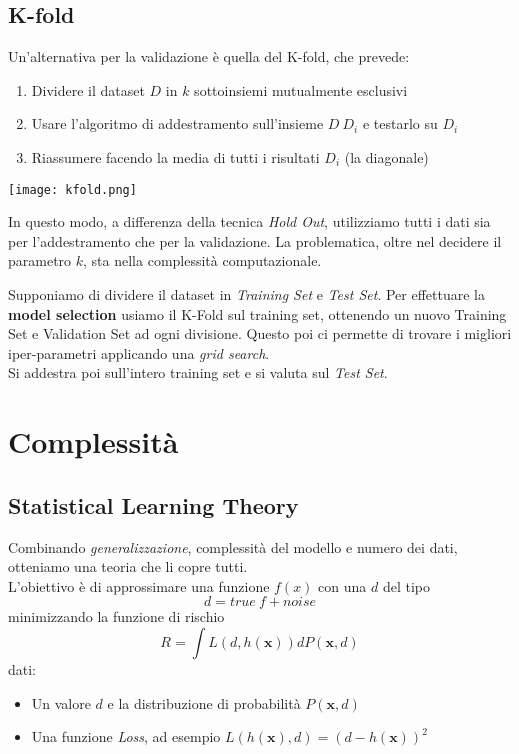 \subsection{K-fold}
Un'alternativa per la validazione è quella del K-fold, che prevede:
\begin{enumerate}
	\item Dividere il dataset $D$ in $k$ sottoinsiemi mutualmente esclusivi
	\item Usare l'algoritmo di addestramento sull'insieme $D\ D_i$ e testarlo su $D_i$
	\item Riassumere facendo la media di tutti i risultati $D_i$ (la diagonale)
\end{enumerate}
\begin{center}
	\texttt{[image: kfold.png]}
\end{center}
In questo modo, a differenza della tecnica \textit{Hold Out}, utilizziamo tutti i dati sia per l'addestramento che per la validazione. La problematica, oltre nel decidere il parametro $k$, sta nella complessità computazionale.

\begin{example}
	Supponiamo di dividere il dataset in \textit{Training Set} e \textit{Test Set}.
	Per effettuare la \textbf{model selection} usiamo il K-Fold sul training set, ottenendo un nuovo Training Set e Validation Set ad ogni divisione. Questo poi ci permette di trovare i migliori iper-parametri applicando una \textit{grid search}.\\
	Si addestra poi sull'intero training set e si valuta sul \textit{Test Set}.
\end{example}

\section{Complessità}
\subsection{Statistical Learning Theory}
Combinando \textit{generalizzazione}, complessità del modello e numero dei dati, otteniamo una teoria che li copre tutti.\\
L'obiettivo è di approssimare una funzione $f(x)$ con una $d$ del tipo
\begin{equation*}
	d=true\: f + noise
\end{equation*}
minimizzando la funzione di rischio
\begin{equation*}
	R = \int L(d,h(\mathbf{x}))dP(\mathbf{x},d)
\end{equation*}
dati:
\begin{itemize}
	\item Un valore $d$ e la distribuzione di probabilità $P(\mathbf{x},d)$
	\item Una funzione \textit{Loss}, ad esempio $L(h(\mathbf{x}),d)=(d-h(\mathbf{x}))^2$
\end{itemize}
